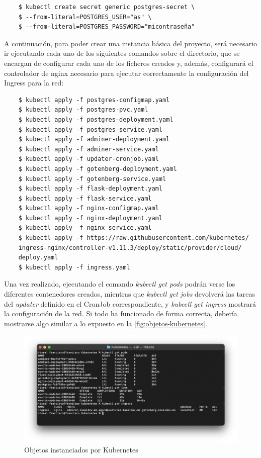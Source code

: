 \documentclass{report}
\begin{document}
            \begin{verbatim}
    $ kubectl create secret generic postgres-secret \
    $ --from-literal=POSTGRES_USER="as" \
    $ --from-literal=POSTGRES_PASSWORD="micontraseña"
            \end{verbatim}

            A continuación, para poder crear una instancia básica del proyecto, será necesario ir ejecutando cada uno de los siguientes comandos sobre el directorio, que se encargan de configurar cada uno de los ficheros creados y, además, configurará el controlador de nginx necesario para ejecutar correctamente la configuración del Ingress para la red:

            \begin{verbatim}
    $ kubectl apply -f postgres-configmap.yaml
    $ kubectl apply -f postgres-pvc.yaml
    $ kubectl apply -f postgres-deployment.yaml
    $ kubectl apply -f postgres-service.yaml
    $ kubectl apply -f adminer-deployment.yaml
    $ kubectl apply -f adminer-service.yaml
    $ kubectl apply -f updater-cronjob.yaml
    $ kubectl apply -f gotenberg-deployment.yaml
    $ kubectl apply -f gotenberg-service.yaml
    $ kubectl apply -f flask-deployment.yaml
    $ kubectl apply -f flask-service.yaml
    $ kubectl apply -f nginx-configmap.yaml
    $ kubectl apply -f nginx-deployment.yaml
    $ kubectl apply -f nginx-service.yaml
    $ kubectl apply -f https://raw.githubusercontent.com/kubernetes/
    ingress-nginx/controller-v1.11.3/deploy/static/provider/cloud/
    deploy.yaml
    $ kubectl apply -f ingress.yaml
            \end{verbatim}

            Una vez realizado, ejecutando el comando \textit{kubectl get pods} podrán verse los diferentes contenedores creados, mientras que \textit{kubectl get jobs} devolverá las tareas del \textit{updater} definido en el CronJob correspondiente, y \textit{kubectl get ingress} mostrará la configuración de la red. Si todo ha funcionado de forma correcta, debería mostrarse algo similar a lo expuesto en la \autoref{fig:objetos-kubernetes}.

            \begin{figure}[H]
                \centering
                \includegraphics[width=1\linewidth]{img/despliegue-kubernetes.png}
                \caption{Objetos instanciados por Kubernetes}
                \label{fig:objetos-kubernetes}
            \end{figure}
\end{document}
